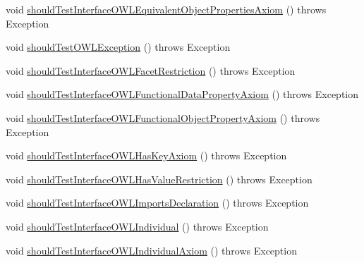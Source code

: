 \begin{DoxyCompactItemize}
\item 
void \hyperlink{classorg_1_1semanticweb_1_1owlapi_1_1contract_1_1_contract_owlapi_model__2_test_a9ef11a596fe0ba9134ca8540d1294850}{should\-Test\-Interface\-O\-W\-L\-Equivalent\-Object\-Properties\-Axiom} ()  throws Exception 
\item 
void \hyperlink{classorg_1_1semanticweb_1_1owlapi_1_1contract_1_1_contract_owlapi_model__2_test_aa36a6707d1ce3480d30b9dfc735ecf2c}{should\-Test\-O\-W\-L\-Exception} ()  throws Exception 
\item 
void \hyperlink{classorg_1_1semanticweb_1_1owlapi_1_1contract_1_1_contract_owlapi_model__2_test_a614cc359d48f33f3ee3b38e1c65ff66b}{should\-Test\-Interface\-O\-W\-L\-Facet\-Restriction} ()  throws Exception 
\item 
void \hyperlink{classorg_1_1semanticweb_1_1owlapi_1_1contract_1_1_contract_owlapi_model__2_test_a1af8e3ec3901ccfdfadb0cb3d6837c68}{should\-Test\-Interface\-O\-W\-L\-Functional\-Data\-Property\-Axiom} ()  throws Exception 
\item 
void \hyperlink{classorg_1_1semanticweb_1_1owlapi_1_1contract_1_1_contract_owlapi_model__2_test_a6bac938a1cd97df65038d24ff70f2876}{should\-Test\-Interface\-O\-W\-L\-Functional\-Object\-Property\-Axiom} ()  throws Exception 
\item 
void \hyperlink{classorg_1_1semanticweb_1_1owlapi_1_1contract_1_1_contract_owlapi_model__2_test_a070b623af06b6c47c95c5b6b3387d986}{should\-Test\-Interface\-O\-W\-L\-Has\-Key\-Axiom} ()  throws Exception 
\item 
void \hyperlink{classorg_1_1semanticweb_1_1owlapi_1_1contract_1_1_contract_owlapi_model__2_test_a732b0a419f44337c7b8fcf7aee0d07ac}{should\-Test\-Interface\-O\-W\-L\-Has\-Value\-Restriction} ()  throws Exception 
\item 
void \hyperlink{classorg_1_1semanticweb_1_1owlapi_1_1contract_1_1_contract_owlapi_model__2_test_a9201a2c78f92d78cb36d105f0e9fa3f7}{should\-Test\-Interface\-O\-W\-L\-Imports\-Declaration} ()  throws Exception 
\item 
void \hyperlink{classorg_1_1semanticweb_1_1owlapi_1_1contract_1_1_contract_owlapi_model__2_test_a051476617e6078ff455d900848178bf9}{should\-Test\-Interface\-O\-W\-L\-Individual} ()  throws Exception 
\item 
void \hyperlink{classorg_1_1semanticweb_1_1owlapi_1_1contract_1_1_contract_owlapi_model__2_test_af65656fc3264cec3afb9fbd507ce0149}{should\-Test\-Interface\-O\-W\-L\-Individual\-Axiom} ()  throws Exception 
\item 

\end{DoxyCompactItemize}
